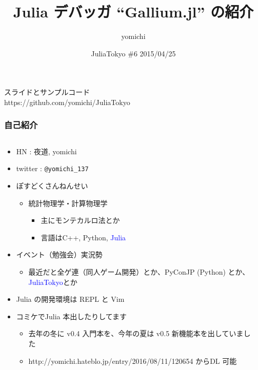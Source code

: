 \documentclass[dvipdfmx]{beamer}
\title{Julia デバッガ ``Gallium.jl'' の紹介}
\author{yomichi}
\date{JuliaTokyo \#6 2015/04/25}
\newcommand{\textblue}[1]{\textcolor{blue}{#1}}
\begin{document}
\begin{frame}
    \titlepage
    スライドとサンプルコード \\ 
    https://github.com/yomichi/JuliaTokyo
\end{frame}

\begin{frame}[containsverbatim]
\frametitle{自己紹介}
\begin{columns}
    \begin{column}{.8\linewidth}
        \begin{itemize}
            \item HN : 夜道, yomichi
            \item twitter : \verb|@yomichi_137|
            \item ぽすどくさんねんせい
            \begin{itemize}
                \item 統計物理学・計算物理学
                \begin{itemize}
                    \item 主にモンテカルロ法とか
                    \item 言語はC++, Python, \textblue{Julia}
                \end{itemize}
            \end{itemize}
            \item イベント（勉強会）実況勢
            \begin{itemize}
                \item 最近だと全ゲ連（同人ゲーム開発）とか、PyConJP (Python) とか、\textblue{JuliaTokyo}とか
            \end{itemize}
            \item Julia の開発環境は REPL と Vim
            \item コミケでJulia 本出したりしてます
            \begin{itemize}
                \item 去年の冬に v0.4 入門本を、今年の夏は v0.5 新機能本を出していました
                \item http://yomichi.hateblo.jp/entry/2016/08/11/120654 からDL 可能
            \end{itemize}
        \end{itemize}
    \end{column}
    \begin{column}{.3\linewidth}

\end{column}
\end{columns}
\end{frame}
\end{document}
